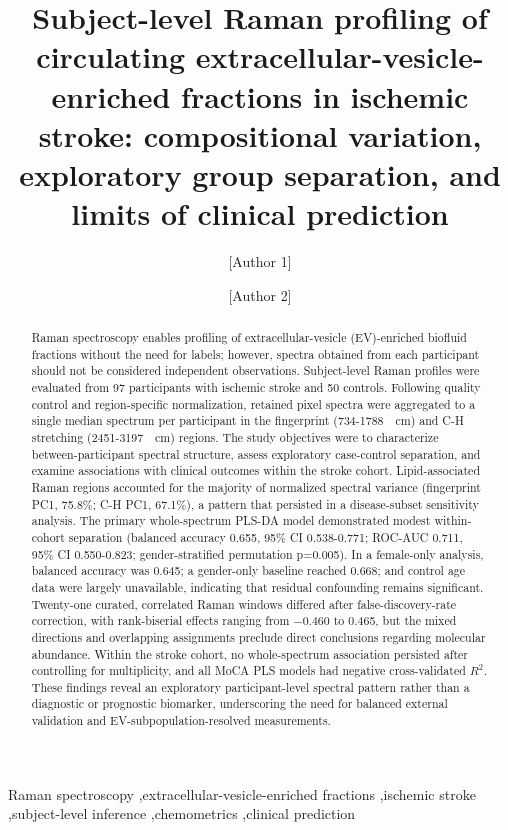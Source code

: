 \documentclass[preprint,12pt]{elsarticle}
\begin{document}
\begin{frontmatter}

\title{Subject-level Raman profiling of circulating extracellular-vesicle-enriched fractions in ischemic stroke: compositional variation, exploratory group separation, and limits of clinical prediction}

\author[1]{[Author 1]}   \author[1,2]{[Author 2]}

 

\begin{abstract}
Raman spectroscopy enables profiling of extracellular-vesicle (EV)-enriched biofluid fractions without the need for labels; however, spectra obtained from each participant should not be considered independent observations. Subject-level Raman profiles were evaluated from 97 participants with ischemic stroke and 50 controls. Following quality control and region-specific normalization, retained pixel spectra were aggregated to a single median spectrum per participant in the fingerprint (734-1788~\si{\per\centi\metre}) and C-H stretching (2451-3197~\si{\per\centi\metre}) regions. The study objectives were to characterize between-participant spectral structure, assess exploratory case-control separation, and examine associations with clinical outcomes within the stroke cohort. Lipid-associated Raman regions accounted for the majority of normalized spectral variance (fingerprint PC1, 75.8\%; C-H PC1, 67.1\%), a pattern that persisted in a disease-subset sensitivity analysis. The primary whole-spectrum PLS-DA model demonstrated modest within-cohort separation (balanced accuracy 0.655, 95\% CI 0.538-0.771; ROC-AUC 0.711, 95\% CI 0.550-0.823; gender-stratified permutation p=0.005). In a female-only analysis, balanced accuracy was 0.645; a gender-only baseline reached 0.668; and control age data were largely unavailable, indicating that residual confounding remains significant. Twenty-one curated, correlated Raman windows differed after false-discovery-rate correction, with rank-biserial effects ranging from $-0.460$ to 0.465, but the mixed directions and overlapping assignments preclude direct conclusions regarding molecular abundance. Within the stroke cohort, no whole-spectrum association persisted after controlling for multiplicity, and all MoCA PLS models had negative cross-validated $R^2$. These findings reveal an exploratory participant-level spectral pattern rather than a diagnostic or prognostic biomarker, underscoring the need for balanced external validation and EV-subpopulation-resolved measurements.

 
\end{abstract}

\begin{keyword} Raman spectroscopy \sep extracellular-vesicle-enriched fractions \sep ischemic stroke \sep subject-level inference \sep chemometrics \sep clinical prediction \end{keyword}

\end{frontmatter}
\end{document}
